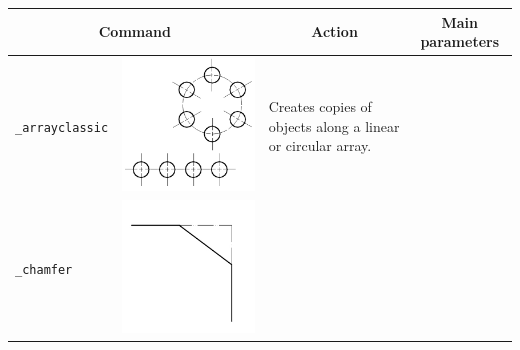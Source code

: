 \documentclass[..]{../IEEEphot}
\begin{document}
\begin{center}
\begin{longtable}{m{.2\linewidth}m{.2\linewidth}m{.25\linewidth}m{.25\linewidth}}
\toprule
    \multicolumn{2}{c}{\bfseries Command} &
    \multicolumn{1}{c}{\bfseries Action} &
    \multicolumn{1}{c}{\bfseries Main parameters} \\
\midrule
\texttt{\_arrayclassic} & \includegraphics[width = 0.8\linewidth, keepaspectratio]{../images/jpg/_arrayclassic.jpg} & Creates copies of objects along a linear or circular array. & 
\\
\midrule
\texttt{\_chamfer} & \includegraphics[width = 0.8\linewidth, keepaspectratio]{../images/jpg/_chamfer.jpg}  

\end{longtable}
\end{center}
\end{document}
